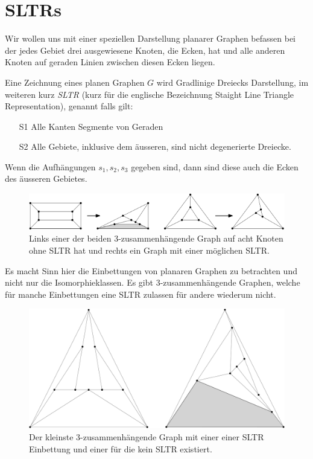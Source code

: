 \section{SLTRs}

Wir wollen uns mit einer speziellen Darstellung planarer Graphen befassen bei der jedes Gebiet drei ausgewiesene Knoten, die Ecken, hat und alle anderen Knoten auf geraden Linien zwischen diesen Ecken liegen.

\begin{definition}[SLTR]\label{defsltr}
Eine Zeichnung eines planen Graphen $G$ wird Gradlinige Dreiecks Darstellung, im weiteren kurz \textit{SLTR} (kurz für die englische Bezeichnung Staight Line Triangle Representation), genannt falls gilt:
\begin{itemize}
\item[S1] Alle Kanten Segmente von Geraden
\item[S2] Alle Gebiete, inklusive dem äusseren, sind nicht degenerierte Dreiecke.
\end{itemize}
Wenn die Aufhängungen $s_1,s_2,s_3$ gegeben sind, dann sind diese auch die Ecken des äusseren Gebietes.
\end{definition}

\begin{figure}
	\centering
  \includegraphics[scale=0.65]{sltr-example.png}
	\caption{Links einer der beiden 3-zusammenhängende Graph auf acht Knoten ohne SLTR hat und rechts ein Graph mit einer möglichen SLTR.}
	\label{cut_figure}
\end{figure}

Es macht Sinn hier die Einbettungen von planaren Graphen zu betrachten und nicht nur die Isomorphieklassen. Es gibt 3-zusammenhängende Graphen, welche für manche Einbettungen eine SLTR zulassen für andere wiederum nicht.

\begin{figure}
	\centering
  \includegraphics[scale=0.65]{10_example.png}
	\caption{Der kleinste 3-zusammenhängende Graph mit einer einer SLTR Einbettung und einer für die kein SLTR existiert.}
	\label{cut_figure}
\end{figure}